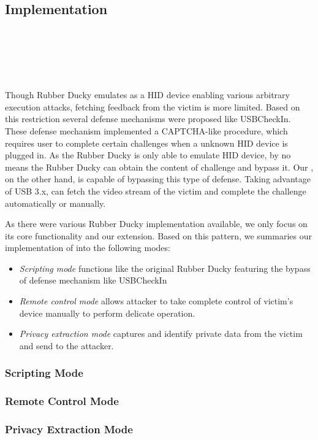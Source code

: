 \subsection{Implementation}
\noindent{}\\
\\
\\
\\
\\
Though Rubber Ducky\cite{rubber} emulates as a HID device enabling various arbitrary execution attacks, fetching feedback from the victim is more limited. Based on this restriction several defense mechanisms were proposed  like USBCheckIn\cite{usbcheckin}. These defense mechanism implemented a CAPTCHA-like\cite{captcha} procedure, which requires user to complete certain challenges when a unknown HID device is plugged in. As the Rubber Ducky is only able to emulate HID device, by no means the Rubber Ducky can obtain the content of challenge and bypass it. Our \tool, on the other hand, is capable of bypassing this type of defense. Taking advantage of USB 3.x\cite{usb31}\cite{usb32}, \tool can fetch the video stream of the victim and complete the challenge automatically or manually.

As there were various Rubber Ducky implementation available, we only focus on its core functionality and our extension. Based on this pattern, we summaries our implementation of \tool into the following modes:

\begin{itemize}
\item\textit{Scripting mode} functions like the original Rubber Ducky featuring the bypass of defense mechanism like USBCheckIn\cite{usbcheckin}
\item \textit{Remote control mode} allows attacker to take complete control of victim's device manually to perform delicate operation.
\item \textit{Privacy extraction mode} captures and identify private data from the victim and send to the attacker.
\end{itemize}

\subsubsection{Scripting Mode}
\subsubsection{Remote Control Mode}
\subsubsection{Privacy Extraction Mode}
